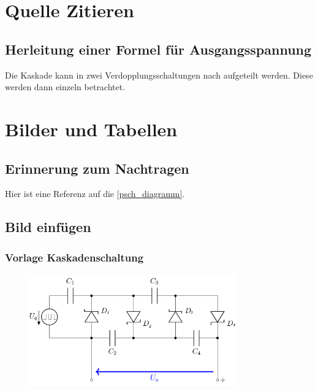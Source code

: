 \documentclass[
12pt,
a4paper,
headings=small,                    %
bibliography=totoc,                %
listof=totoc,                      %
parskip=half*,                     %
]{scrartcl}                        %
\newcommand{\laborsubsection}[2] {
	\renewcommand{\thesubsection}{#1 \thesection.\arabic{subsection}}
	\subsection{{\boldmath #2}}
	\renewcommand{\thesubsection}{\thesection.\arabic{subsection}}
}
\newcommand{\resetlaborsectioncounter}{\setcounter{subsection}{0}}
\begin{document}
\section{Quelle Zitieren}
\laborsubsection{V}{Herleitung einer Formel für Ausgangsspannung}
Die Kaskade kann in zwei Verdopplungsschaltungen nach \autocite[42]{moeller} aufgeteilt werden. Diese werden dann einzeln betrachtet.

\section{Bilder und Tabellen}
\laborsubsection{V}{Erinnerung zum Nachtragen}
Hier ist eine Referenz auf die \autoref{psch_diagramm}.
\begin{figure}[H]
    \centering
    \label{psch_diagramm}
\end{figure}

\resetlaborsectioncounter
\laborsubsection{D}{Bild einfügen}
\subsubsection{Vorlage Kaskadenschaltung}
\begin{figure}[H]
    \centering
    \includegraphics[width=0.8\textwidth]{schaltung}
    \label{kaskadenschaltung}
\end{figure}
\end{document}
